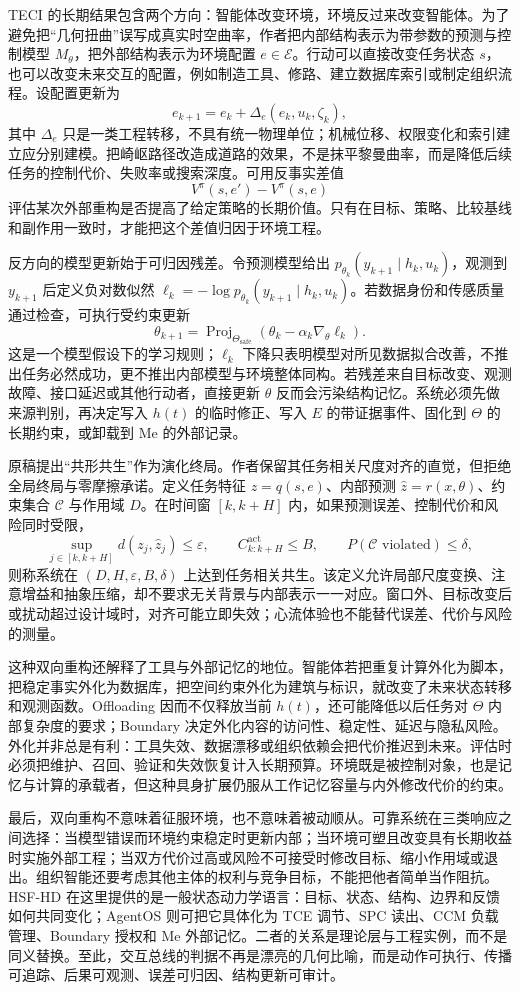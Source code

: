 TECI 的长期结果包含两个方向：智能体改变环境，环境反过来改变智能体。为了避免把“几何扭曲”误写成真实时空曲率，作者把内部结构表示为带参数的预测与控制模型 $M_{\theta}$，把外部结构表示为环境配置 $e\in\mathcal E$。行动可以直接改变任务状态 $s$，也可以改变未来交互的配置，例如制造工具、修路、建立数据库索引或制定组织流程。设配置更新为
\[
e_{k+1}=e_k+\Delta_e(e_k,u_k,\zeta_k),
\]
其中 $\Delta_e$ 只是一类工程转移，不具有统一物理单位；机械位移、权限变化和索引建立应分别建模。把崎岖路径改造成道路的效果，不是抹平黎曼曲率，而是降低后续任务的控制代价、失败率或搜索深度。可用反事实差值
\[
V^{\pi}(s,e')-V^{\pi}(s,e)
\]
评估某次外部重构是否提高了给定策略的长期价值。只有在目标、策略、比较基线和副作用一致时，才能把这个差值归因于环境工程。

反方向的模型更新始于可归因残差。令预测模型给出 $p_{\theta_k}(y_{k+1}\mid h_k,u_k)$，观测到 $y_{k+1}$ 后定义负对数似然 $\ell_k=-\log p_{\theta_k}(y_{k+1}\mid h_k,u_k)$。若数据身份和传感质量通过检查，可执行受约束更新
\[
\theta_{k+1}=\operatorname{Proj}_{\Theta_{\mathrm{safe}}}
\left(\theta_k-\alpha_k\nabla_{\theta}\ell_k\right).
\]
这是一个模型假设下的学习规则；$\ell_k$ 下降只表明模型对所见数据拟合改善，不推出任务必然成功，更不推出内部模型与环境整体同构。若残差来自目标改变、观测故障、接口延迟或其他行动者，直接更新 $\theta$ 反而会污染结构记忆。系统必须先做来源判别，再决定写入 $h(t)$ 的临时修正、写入 $E$ 的带证据事件、固化到 $\Theta$ 的长期约束，或卸载到 Me 的外部记录。

原稿提出“共形共生”作为演化终局。作者保留其任务相关尺度对齐的直觉，但拒绝全局终局与零摩擦承诺。定义任务特征 $z=q(s,e)$、内部预测 $\hat z=r(x,\theta)$、约束集合 $\mathcal C$ 与作用域 $D$。在时间窗 $[k,k+H]$ 内，如果预测误差、控制代价和风险同时受限，
\[
\sup_{j\in[k,k+H]}d(z_j,\hat z_j)\leq\varepsilon,
\qquad C^{\mathrm{act}}_{k:k+H}\leq B,
\qquad P(\mathcal C\text{ violated})\leq\delta,
\]
则称系统在 $(D,H,\varepsilon,B,\delta)$ 上达到任务相关共生。该定义允许局部尺度变换、注意增益和抽象压缩，却不要求无关背景与内部表示一一对应。窗口外、目标改变后或扰动超过设计域时，对齐可能立即失效；心流体验也不能替代误差、代价与风险的测量。

这种双向重构还解释了工具与外部记忆的地位。智能体若把重复计算外化为脚本，把稳定事实外化为数据库，把空间约束外化为建筑与标识，就改变了未来状态转移和观测函数。Offloading 因而不仅释放当前 $h(t)$，还可能降低以后任务对 $\Theta$ 内部复杂度的要求；Boundary 决定外化内容的访问性、稳定性、延迟与隐私风险。外化并非总是有利：工具失效、数据漂移或组织依赖会把代价推迟到未来。评估时必须把维护、召回、验证和失效恢复计入长期预算。环境既是被控制对象，也是记忆与计算的承载者，但这种具身扩展仍服从工作记忆容量与内外修改代价的约束。

最后，双向重构不意味着征服环境，也不意味着被动顺从。可靠系统在三类响应之间选择：当模型错误而环境约束稳定时更新内部；当环境可塑且改变具有长期收益时实施外部工程；当双方代价过高或风险不可接受时修改目标、缩小作用域或退出。组织智能还要考虑其他主体的权利与竞争目标，不能把他者简单当作阻抗。HSF-HD 在这里提供的是一般状态动力学语言：目标、状态、结构、边界和反馈如何共同变化；AgentOS 则可把它具体化为 TCE 调节、SPC 读出、CCM 负载管理、Boundary 授权和 Me 外部记忆。二者的关系是理论层与工程实例，而不是同义替换。至此，交互总线的判据不再是漂亮的几何比喻，而是动作可执行、传播可追踪、后果可观测、误差可归因、结构更新可审计。
